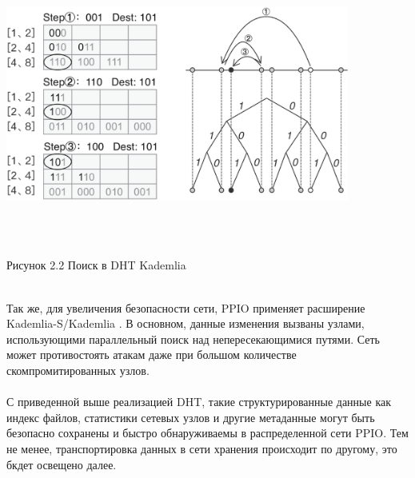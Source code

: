 \documentclass[10pt,a4paper]{article}
\begin{document}
 \vspace{-0.3em}
  \\
\\ \centerline{\includegraphics[width=320pt]{fig2}}
\\\\ \centerline{{Рисунок 2.2 Поиск в DHT Kademlia}}
\vspace{-0.5em}
\\
Так же, для увеличения безопасности сети, PPIO применяет расширение Kademlia-S/Kademlia \cite{article23}. В основном, данные изменения вызваны узлами, использующими параллельный поиск над непересекающимися путями.  Сеть может противостоять атакам даже при большом количестве скомпромитированных узлов.
\vspace{-0.5em}
\\ \\С приведенной выше реализацией DHT, такие структурированные данные как индекс файлов, статистики сетевых узлов и другие метаданные могут быть безопасно сохранены и быстро обнаруживаемы в  распределенной сети PPIO. Тем не менее, транспортировка данных в сети хранения происходит по другому, это бкдет освещено далее.
  \vspace{-0.5em}
\end{document}
